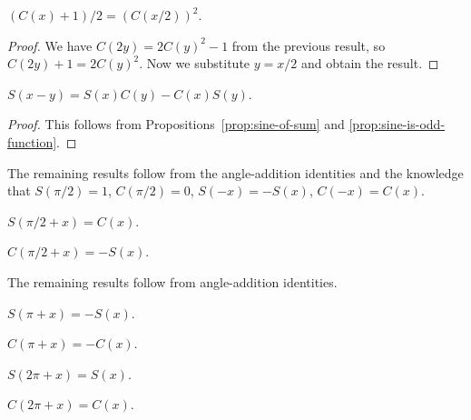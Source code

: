 \begin{proposition}
$(C(x) + 1)/2 = (C(x/2))^{2}$.
\end{proposition}

\begin{proof}
  We have $C(2y) = 2C(y)^{2} - 1$ from the previous result, so
  $C(2y) + 1 = 2C(y)^{2}$. Now we substitute $y=x/2$ and obtain the result.
\end{proof}

\begin{proposition}
$S(x-y) = S(x)C(y) - C(x)S(y)$.
\end{proposition}

\begin{proof}
This follows from Propositions~\ref{prop:sine-of-sum} and \ref{prop:sine-is-odd-function}.
\end{proof}

The remaining results follow from the angle-addition identities and the
knowledge that $S(\pi/2)=1$, $C(\pi/2)=0$, $S(-x)=-S(x)$, $C(-x)=C(x)$.

\begin{proposition}
$S(\pi/2 + x) = C(x)$.
\end{proposition}

\begin{proposition}
$C(\pi/2 + x) = -S(x)$.
\end{proposition}

The remaining results follow from angle-addition identities.

\begin{proposition}
$S(\pi + x) = - S(x)$.
\end{proposition}

\begin{proposition}
$C(\pi + x) = -C(x)$.
\end{proposition}

\begin{proposition}
$S(2\pi + x) = S(x)$.
\end{proposition}

\begin{proposition}
$C(2\pi + x) = C(x)$.
\end{proposition}
